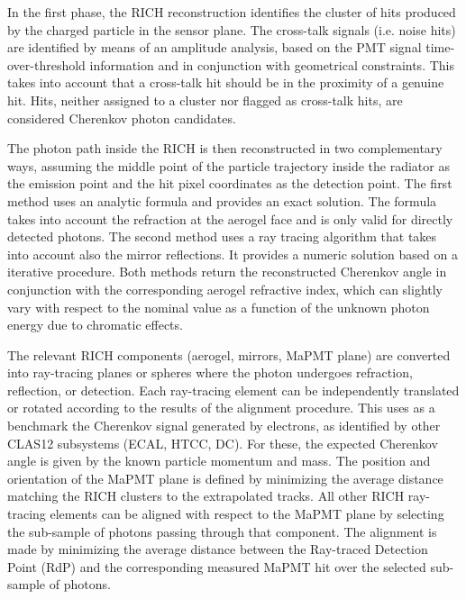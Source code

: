 In the first phase, the RICH reconstruction identifies the cluster of hits produced by the charged particle in
the sensor plane. The cross-talk signals (i.e. noise hits) are identified by means of an amplitude analysis, based
on the PMT signal time-over-threshold information and in conjunction with geometrical constraints. This takes
into account that a cross-talk hit should be in the proximity of a genuine hit. Hits, neither assigned to a cluster
nor flagged as cross-talk hits, are considered Cherenkov photon candidates. 

The photon path inside the RICH is then reconstructed in two complementary ways, assuming the middle point of
the particle trajectory inside the radiator as the emission point and the hit pixel coordinates as the detection
point. The first method uses an analytic formula and provides an exact solution. The formula takes into account
the refraction at the aerogel face and is only valid for directly detected photons. The second method uses a ray
tracing algorithm that takes into account also the mirror reflections. It provides a numeric solution based on a
iterative procedure. Both methods return the reconstructed Cherenkov angle in conjunction with the corresponding
aerogel refractive index, which can slightly vary with respect to the nominal value as a function of the unknown photon
energy due to chromatic effects. 

The relevant RICH components (aerogel, mirrors, MaPMT plane) are converted into ray-tracing planes or spheres
where the photon undergoes refraction, reflection, or detection. Each ray-tracing element can be independently
translated or rotated according to the results of the alignment procedure. This uses as a benchmark the Cherenkov
signal generated by electrons, as identified by other CLAS12 subsystems (ECAL, HTCC, DC). For these, the
expected Cherenkov angle is given by the known particle momentum and mass. The position and orientation of the
MaPMT plane is defined by minimizing the average distance matching the RICH clusters to the extrapolated tracks.
All other RICH ray-tracing elements can be aligned with respect to the MaPMT plane by selecting the sub-sample of
photons passing through that component. The alignment is made by minimizing the average distance between the
Ray-traced Detection Point (RdP) and the corresponding measured MaPMT hit over the selected sub-sample of
photons.

